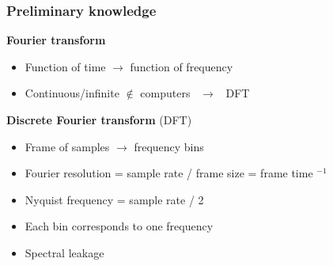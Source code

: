\documentclass[table]{beamer}
\begin{document}
\begin{frame}
\frametitle{Preliminary knowledge}
    {\large \textbf{Fourier transform}}
    \begin{itemize}
        \item Function of time $\rightarrow$ function of frequency
        \item Continuous/infinite $\not \in$ computers \ $\rightarrow$ \ DFT
    \end{itemize}
    \bigskip

    {\large \textbf{Discrete Fourier transform} (DFT)}
    \begin{itemize}
        \item Frame of samples $\rightarrow$ frequency bins
        \item Fourier resolution = sample rate / frame size = frame time ${\!}^{-1}$
        \item Nyquist frequency = sample rate / 2
        \item Each bin corresponds to one frequency
        \item Spectral leakage
    \end{itemize}
\end{frame}
\end{document}
